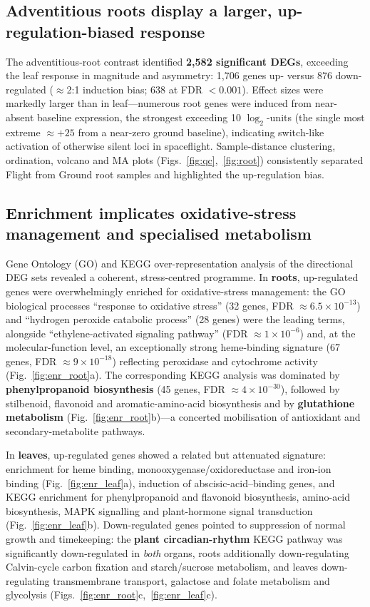 \documentclass[10pt,twocolumn]{article}
\begin{document}
\subsection{Adventitious roots display a larger, up-regulation-biased response}
The adventitious-root contrast identified \textbf{2,582 significant DEGs}, exceeding
the leaf response in magnitude and asymmetry: 1,706 genes up- versus 876
down-regulated ($\approx$2:1 induction bias; 638 at FDR $<0.001$). Effect sizes were
markedly larger than in leaf---numerous root genes were induced from near-absent
baseline expression, the strongest exceeding 10 $\log_2$-units (the single most
extreme $\approx +25$ from a near-zero ground baseline), indicating switch-like
activation of otherwise silent loci in spaceflight. Sample-distance clustering,
ordination, volcano and MA plots (Figs.~\ref{fig:qc},~\ref{fig:root}) consistently
separated Flight from Ground root samples and highlighted the up-regulation bias.

\subsection{Enrichment implicates oxidative-stress management and specialised metabolism}
Gene Ontology (GO) and KEGG over-representation analysis of the directional DEG sets
revealed a coherent, stress-centred programme. In \textbf{roots}, up-regulated genes
were overwhelmingly enriched for oxidative-stress management: the GO biological
processes ``response to oxidative stress'' (32 genes, FDR $\approx 6.5\times10^{-13}$)
and ``hydrogen peroxide catabolic process'' (28 genes) were the leading terms,
alongside ``ethylene-activated signaling pathway'' (FDR $\approx 1\times10^{-6}$) and,
at the molecular-function level, an exceptionally strong heme-binding signature (67
genes, FDR $\approx 9\times10^{-18}$) reflecting peroxidase and cytochrome activity
(Fig.~\ref{fig:enr_root}a). The corresponding KEGG analysis was dominated by
\textbf{phenylpropanoid biosynthesis} (45 genes, FDR $\approx 4\times10^{-30}$),
followed by stilbenoid, flavonoid and aromatic-amino-acid biosynthesis and by
\textbf{glutathione metabolism} (Fig.~\ref{fig:enr_root}b)---a concerted mobilisation
of antioxidant and secondary-metabolite pathways.

In \textbf{leaves}, up-regulated genes showed a related but attenuated signature:
enrichment for heme binding, monooxygenase/oxidoreductase and iron-ion binding
(Fig.~\ref{fig:enr_leaf}a), induction of abscisic-acid--binding genes, and KEGG
enrichment for phenylpropanoid and flavonoid biosynthesis, amino-acid biosynthesis,
MAPK signalling and plant-hormone signal transduction (Fig.~\ref{fig:enr_leaf}b).
Down-regulated genes pointed to suppression of normal growth and timekeeping: the
\textbf{plant circadian-rhythm} KEGG pathway was significantly down-regulated in
\emph{both} organs, roots additionally down-regulating Calvin-cycle carbon fixation
and starch/sucrose metabolism, and leaves down-regulating transmembrane transport,
galactose and folate metabolism and glycolysis
(Figs.~\ref{fig:enr_root}c,~\ref{fig:enr_leaf}c).
\end{document}
